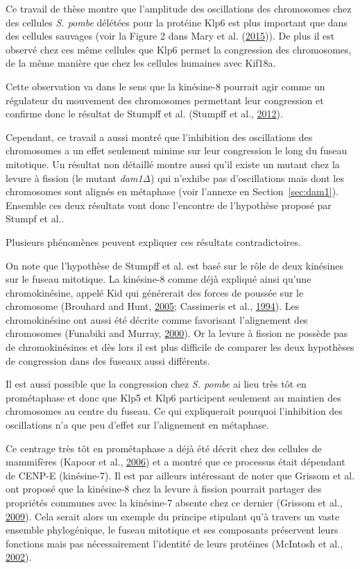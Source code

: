 \documentclass[12pt,a4paper,twoside,openright]{book}
\begin{document}
Ce travail de thèse montre que l'amplitude des oscillations des
chromosomes chez des cellules \emph{S. pombe} délétées pour la protéine
Klp6 est plus important que dans des cellules sauvages (voir la Figure 2
dans Mary et al. (\protect\hyperlink{ref-Mary2015}{2015})). De plus il
est observé chez ces même cellules que Klp6 permet la congression des
chromosomes, de la même manière que chez les cellules humaines avec
Kif18a.

Cette observation va dans le sens que la kinésine-8 pourrait agir comme
un régulateur du mouvement des chromosomes permettant leur congression
et confirme donc le résultat de Stumpff et al. (Stumpff et al.,
\protect\hyperlink{ref-Stumpff2012}{2012}).

Cependant, ce travail a aussi montré que l'inhibition des oscillations
des chromosomes a un effet seulement minime sur leur congression le long
du fuseau mitotique. Un résultat non détaillé montre aussi qu'il existe
un mutant chez la levure à fission (le mutant \emph{dam1Δ}) qui n'exhibe
pas d'oscillations mais dont les chromosomes sont alignés en métaphase
(voir l'annexe en Section~\ref{sec:dam1}). Ensemble ces deux résultats
vont donc l'encontre de l'hypothèse proposé par Stumpf et al..

Plusieurs phénomènes peuvent expliquer ces résultats contradictoires.

On note que l'hypothèse de Stumpff et al. est basé sur le rôle de deux
kinésines sur le fuseau mitotique. La kinésine-8 comme déjà expliqué
ainsi qu'une chromokinésine, appelé Kid qui générerait des forces de
poussée sur le chromosome (Brouhard and Hunt,
\protect\hyperlink{ref-Brouhard2005}{2005}; Cassimeris et al.,
\protect\hyperlink{ref-Cassimeris1994}{1994}). Les chromokinésine ont
aussi été décrite comme favorisant l'alignement des chromosomes
(Funabiki and Murray, \protect\hyperlink{ref-Funabiki2000}{2000}). Or la
levure à fission ne possède pas de chromokinésines et dès lors il est
plus difficile de comparer les deux hypothèses de congression dans des
fuseaux aussi différents.

Il est aussi possible que la congression chez \emph{S. pombe} ai lieu
très tôt en prométaphase et donc que Klp5 et Klp6 participent seulement
au maintien des chromosomes au centre du fuseau. Ce qui expliquerait
pourquoi l'inhibition des oscillations n'a que peu d'effet sur
l'alignement en métaphase.

Ce centrage très tôt en prométaphase a déjà été décrit chez des cellules
de mammifères (Kapoor et al., \protect\hyperlink{ref-Kapoor2006}{2006})
et a montré que ce processus était dépendant de CENP-E (kinésine-7). Il
est par ailleurs intéressant de noter que Grissom et al. ont proposé que
la kinésine-8 chez la levure à fission pourrait partager des propriétés
communes avec la kinésine-7 absente chez ce dernier (Grissom et al.,
\protect\hyperlink{ref-Grissom2009}{2009}). Cela serait alors un exemple
du principe stipulant qu'à travers un vaste ensemble phylogénique, le
fuseau mitotique et ses composants préservent leurs fonctions mais pas
nécessairement l'identité de leurs protéines (McIntosh et al.,
\protect\hyperlink{ref-McIntosh2002b}{2002}).
\end{document}
